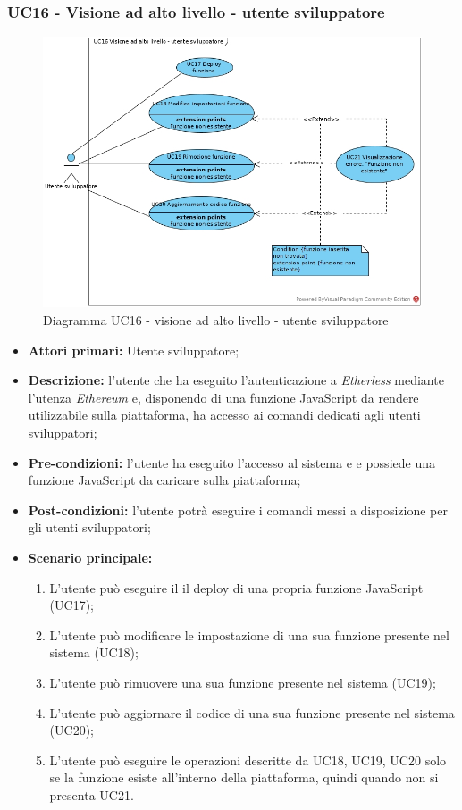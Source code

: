 \subsubsection{UC16 - Visione ad alto livello - utente sviluppatore}
\begin{figure}[h]
	\centering
	\includegraphics[width=\linewidth]{res/img/UC16.jpg}
	\caption{Diagramma UC16 - visione ad alto livello - utente sviluppatore}
\end{figure}
\begin{itemize}
	\item \textbf{Attori primari:} Utente sviluppatore;
	\item \textbf{Descrizione:} l'utente che ha eseguito l'autenticazione a \textit{Etherless} mediante l'utenza \textit{Ethereum\glo} e, disponendo di una funzione JavaScript da rendere utilizzabile sulla piattaforma, ha accesso ai comandi dedicati agli utenti sviluppatori;
	\item \textbf{Pre-condizioni:} l'utente ha eseguito l'accesso al sistema e e possiede una funzione JavaScript da caricare sulla piattaforma;
	\item \textbf{Post-condizioni:} l'utente potrà eseguire i comandi messi a disposizione per gli utenti sviluppatori;
	\item \textbf{Scenario principale:}
	\begin{enumerate}
		\item L'utente può eseguire il il deploy di una propria funzione JavaScript (UC17);
		\item L'utente può modificare le impostazione di una sua funzione presente nel sistema (UC18);
		\item L'utente può rimuovere una sua funzione presente nel sistema (UC19);
		\item L'utente può aggiornare il codice di una sua funzione presente nel sistema (UC20);
		\item L'utente può eseguire le operazioni descritte da UC18, UC19, UC20 solo se la funzione esiste all'interno della piattaforma, quindi quando non si presenta UC21.
	\end{enumerate}
\end{itemize}
